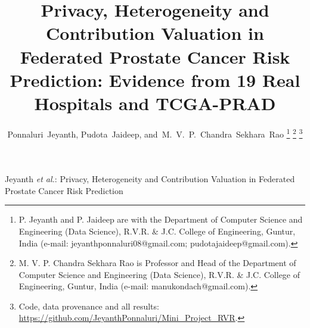 \documentclass[journal]{IEEEtran}
\begin{document}
\title{Privacy, Heterogeneity and Contribution Valuation in Federated Prostate Cancer Risk Prediction: Evidence from 19 Real Hospitals and TCGA-PRAD}

\author{Ponnaluri~Jeyanth,
        Pudota~Jaideep,
        and~M.~V.~P.~Chandra~Sekhara~Rao%
\thanks{P. Jeyanth and P. Jaideep are with the Department of Computer Science and Engineering (Data Science), R.V.R. \& J.C. College of Engineering, Guntur, India (e-mail: jeyanthponnaluri08@gmail.com; pudotajaideep@gmail.com).}%
\thanks{M. V. P. Chandra Sekhara Rao is Professor and Head of the Department of Computer Science and Engineering (Data Science), R.V.R. \& J.C. College of Engineering, Guntur, India (e-mail: manukondach@gmail.com).}%
\thanks{Code, data provenance and all results: \protect\url{https://github.com/JeyanthPonnaluri/Mini_Project_RVR}.}}

%
{Jeyanth \MakeLowercase{\textit{et al.}}: Privacy, Heterogeneity and Contribution Valuation in Federated Prostate Cancer Risk Prediction}

\maketitle
\end{document}
